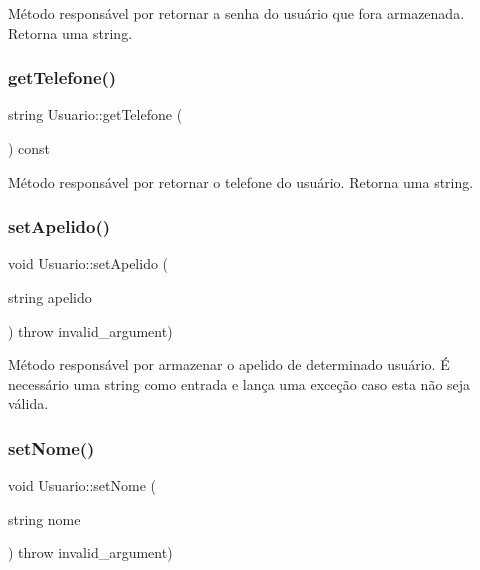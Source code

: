 Método responsável por retornar a senha do usuário que fora armazenada. Retorna uma string. \mbox{\label{classUsuario_ae2a44b0716930c62458e6fc8c7339537}} 
\subsubsection{\texorpdfstring{get\+Telefone()}{getTelefone()}}
{\footnotesize\ttfamily string Usuario\+::get\+Telefone (\begin{DoxyParamCaption}{ }\end{DoxyParamCaption}) const\hspace{0.3cm}{\ttfamily [inline]}}

Método responsável por retornar o telefone do usuário. Retorna uma string. \mbox{\label{classUsuario_ae1c5a1f4d241bfd859ba8d12271265c7}} 
\subsubsection{\texorpdfstring{set\+Apelido()}{setApelido()}}
{\footnotesize\ttfamily void Usuario\+::set\+Apelido (\begin{DoxyParamCaption}\item[{string}]{apelido }\end{DoxyParamCaption}) throw  invalid\+\_\+argument) \hspace{0.3cm}{\ttfamily [inline]}}

Método responsável por armazenar o apelido de determinado usuário. É necessário uma string como entrada e lança uma exceção caso esta não seja válida. \mbox{\label{classUsuario_a7c9b128fcb7b02e6595200ad1cf6f89b}} 
\subsubsection{\texorpdfstring{set\+Nome()}{setNome()}}
{\footnotesize\ttfamily void Usuario\+::set\+Nome (\begin{DoxyParamCaption}\item[{string}]{nome }\end{DoxyParamCaption}) throw  invalid\+\_\+argument) \hspace{0.3cm}{\ttfamily [inline]}}

